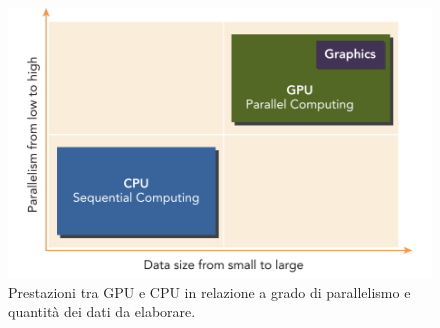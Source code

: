 \begin{figure}[H]
\centering
\includegraphics[scale=0.3]{img/Performancecpu-gpu.png}
\caption{Prestazioni tra GPU e CPU in relazione a grado di parallelismo e quantità dei dati da elaborare.}
\end{figure}